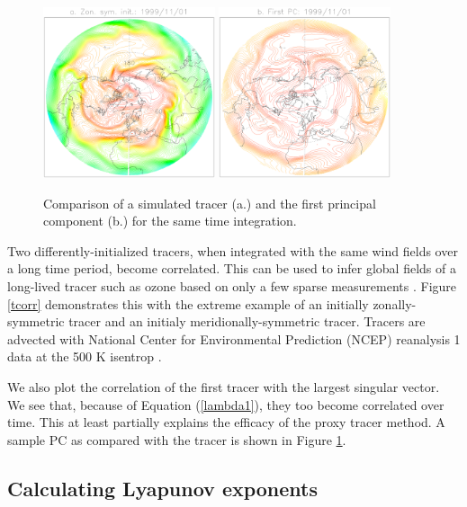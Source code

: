\documentclass{article}
\begin{document}
\begin{figure}
\includegraphics[width=0.45\textwidth]{../pc_proxy/tsample.eps}
\includegraphics[width=0.45\textwidth]{../pc_proxy/pc1.eps}
\caption{Comparison of a simulated tracer (a.) and the first principal
component (b.) for the same time integration.}\label{pc1}
\end{figure}

Two differently-initialized tracers, when integrated with the same
wind fields over a long time period, become correlated.
This can be used to infer global fields of a long-lived tracer such as
ozone based on only a few sparse measurements 
\citep{Allen_Nakamura2003,Randall_etal2002}.
Figure \ref{tcorr} demonstrates this with the extreme example of an initially
zonally-symmetric tracer and an initialy meridionally-symmetric tracer.
Tracers are advected with National Center for Environmental Prediction
(NCEP) reanalysis 1 data at the 500 K isentrop \citep{Kalnay_etal1996}.

We also plot the correlation of the first tracer with the largest singular
vector.  We see that, because of Equation (\ref{lambda1}), they too become
correlated over time.
This at least partially explains the efficacy of the proxy tracer method.
A sample PC as compared with the tracer is shown in Figure \ref{pc1}.  

\subsection{Calculating Lyapunov exponents}
\end{document}
